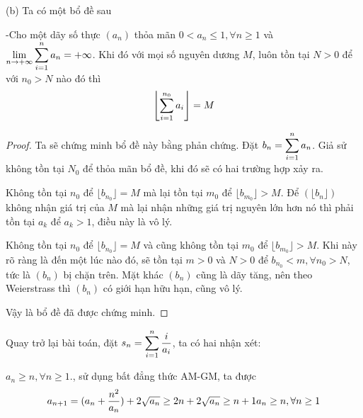 \documentclass[11pt]{scrartcl}
\begin{document}
\begin{itemize}[label=, leftmargin=0em, itemsep=0.5em]
\begin{sol}
        (b) 
        Ta có một bổ đề sau 
        \begin{theo}
            -Cho một dãy số thực $(a_n)$ thỏa mãn $0 < a_n \leq 1, \forall n \geq 1$ và $\displaystyle\lim_{n \to +\infty} \displaystyle\sum_{i = 1}^n a_n = +\infty$. Khi đó với mọi số nguyên dương $M$, luôn tồn tại $N > 0$ để với $n_0 > N$ nào đó thì 
            \[
            \left\lfloor \displaystyle\sum_{i = 1}^{n_0} a_i \right\rfloor = M
            \]
        \end{theo}
        \begin{proof} Ta sẽ chứng minh bổ đề này bằng phản chứng. Đặt $b_n = \displaystyle\sum_{i = 1}^n a_n$. Giả sử không tồn tại $N_0$ để thỏa mãn bổ đề, khi đó sẽ có hai trường hợp xảy ra. 

         Không tồn tại $n_0$ để $\lfloor b_{n_0}\rfloor =M$ mà lại tồn tại $m_0$ để $\lfloor b_{m_0} \rfloor > M$. Để $(\lfloor b_n \rfloor)$ không nhận giá trị của $M$ mà lại nhận những giá trị nguyên lớn hơn nó thì phải tồn tại $a_k$ để $a_k > 1$, điều này là vô lý.

         Không tồn tại $n_0$ để $\lfloor b_{n_0}\rfloor =M$ và cũng không tồn tại $m_0$ để $\lfloor b_{m_0} \rfloor > M$. Khi này rõ ràng là đến một lúc nào đó, sẽ tồn tại $m > 0$ và $N > 0$ để $b_{n_0} < m, \forall n_0 > N$, tức là $(b_n)$ bị chặn trên. Mặt khác $(b_n)$ cũng là dãy tăng, nên theo Weierstrass thì $(b_n)$ có giới hạn hữu hạn, cũng vô lý. 

        Vậy là bổ đề đã được chứng minh.
        \end{proof}
        Quay trở lại bài toán, đặt $s_n = \dsum_{i = 1}^n \frac{i}{a_i}$, ta có hai nhận xét:
        
         $a_n \geq n,\forall n \geq 1$., sử dụng bất đẳng thức AM-GM, ta được 
        \[
            a_{n + 1} = (a_n + \frac{n^2}{a_n}) + 2\sqrt{a_n} \geq 2n + 2\sqrt{a_n} \geq n + 1 \ra a_n \geq n,\forall n \geq 1
        \]


\end{sol}
\end{itemize}
\end{document}

